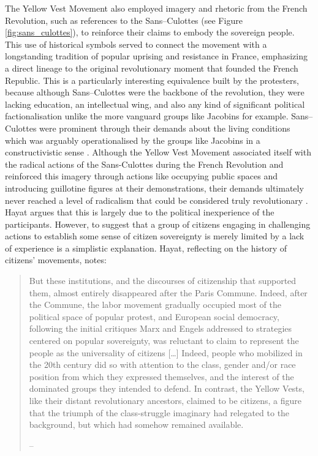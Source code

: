 The Yellow Vest Movement also employed imagery and rhetoric from the French Revolution, such as references to the Sans--Culottes (see Figure \ref{fig:sans_culottes}), to reinforce their claims to embody the sovereign people. This use of historical symbols served to connect the movement with a longstanding tradition of popular uprising and resistance in France, emphasizing a direct lineage to the original revolutionary moment that founded the French Republic. This is a particularly interesting equivalence built by the protesters, because although Sans--Culottes were the backbone of the revolution, they were lacking education, an intellectual wing, and also any kind of significant political factionalisation unlike the more vanguard groups like Jacobins for example. Sans--Culottes were prominent through their demands about the living conditions which was arguably operationalised by the groups like Jacobins in a constructivistic sense . Although the Yellow Vest Movement associated itself with the radical actions of the Sans-Culottes during the French Revolution and reinforced this imagery through actions like occupying public spaces and introducing guillotine figures at their demonstrations, their demands ultimately never reached a level of radicalism that could be considered truly revolutionary \parencite[see 13]{hayat2024}. Hayat argues that this is largely due to the political inexperience of the participants. However, to suggest that a group of citizens engaging in challenging actions to establish some sense of citizen sovereignty is merely limited by a lack of experience is a simplistic explanation. Hayat, reflecting on the history of citizens' movements, notes:

\begin{quote}

  But these institutions, and the discourses of citizenship that supported them, almost entirely disappeared after the Paris Commune. Indeed, after the Commune, the labor movement gradually occupied most of the political space of popular protest, and European social democracy, following the initial critiques Marx and Engels addressed to strategies centered on popular sovereignty, was reluctant to claim to represent the people as the universality of citizens [\ldots] Indeed, people who mobilized in the 20th century did so with attention to the class, gender and/or race position from which they expressed themselves, and the interest of the dominated groups they intended to defend. In contrast, the Yellow Vests, like their distant revolutionary ancestors, claimed to be citizens, a figure that the triumph of the class-struggle imaginary had relegated to the background, but which had somehow remained available.

  -- \cite[14]{hayat2024}

\end{quote}

